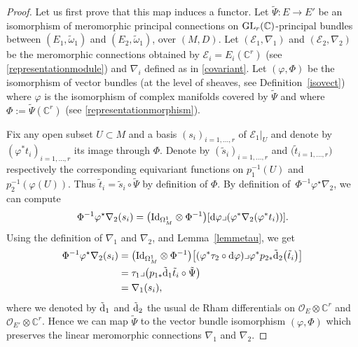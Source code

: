 \documentclass[pdftex]{sigma}
\numberwithin{equation}{section}
\begin{document}
\begin{proof} Let us first prove that this map induces a functor. Let $\tilde{\Psi}\colon E \longrightarrow E'$ be an isomorphism of meromorphic principal connections on ${\rm GL}_r(\mathbb{C})$-principal bundles between $(E_1,\tilde{\omega}_1)$ and $(E_2,\tilde{\omega}_1)$, over $(M,D)$. Let $(\mathcal{E}_1,\nabla_1)$ and $(\mathcal{E}_2,\nabla_2)$ be the meromorphic connections obtained by $\mathcal{E}_i=E_i(\mathbb{C}^r)$ (see \eqref{representationmodule}) and $\nabla_i$ defined as in \eqref{covariant}. Let $(\varphi,\Phi)$ be the isomorphism of vector bundles (at the level of sheaves, see Definition~\ref{isovect}) where $\varphi$ is the isomorphism of complex manifolds covered by $\tilde{\Psi}$ and where $\Phi:=\tilde{\Psi}(\mathbb{C}^r)$ (see \eqref{representationmorphism}).

Fix any open subset $U\subset M$ and a basis $(s_i)_{i=1,\dots,r}$ of $\mathcal{E}_1\vert_U$ and denote by $(\varphi^* t_i)_{i=1,\dots,r}$ its image through $\Phi$. Denote by $(\tilde{s}_i)_{i=1,\dots,r}$ and $\big(\tilde{t}_{i=1,\dots,r}\big)$ respectively the corresponding equivariant functions on $p_1^{-1}(U)$ and $p_2^{-1}(\varphi(U))$. Thus $\tilde{t}_i = \tilde{s}_i \circ \tilde{\Psi}$ by definition of $\Phi$. By definition of~$\Phi^{-1} \varphi^\star \nabla_2$, we can compute
\begin{gather*}
\Phi^{-1} \varphi^\star \nabla_2(s_i) = \big({\rm Id}_{\Omega^1_{M}} \otimes \Phi^{-1}\big)[{\rm d}\varphi \lrcorner (\varphi^* \nabla_2 (\varphi^* t_i))]. \end{gather*}
Using the definition of $\nabla_1$ and $\nabla_2$, and Lemma~\ref{lemmetau}, we get
\begin{align*}
 \Phi^{-1} \varphi^\star \nabla_2(s_i)&= \big({\rm Id}_{\Omega^1_{M}} \otimes \Phi^{-1}\big)\big[ (\varphi^*\tau_2\circ {\rm d}\varphi) \lrcorner \varphi^* p_{2*}\tilde{{\rm d}}_2\big(\tilde{t}_i\big)\big]\\
 &= \tau_1 \lrcorner \big(p_{1*}\tilde{{\rm d}}_1\tilde{t}_i \circ \tilde{\Psi}\big) \\
 &=\nabla_1(s_i), \end{align*}
 where we denoted by $\tilde{{\rm d}}_1$ and $\tilde{{\rm d}}_2$ the usual de Rham differentials on $\mathcal{O}_{E}\otimes \mathbb{C}^r$ and $\mathcal{O}_{E'}\otimes \mathbb{C}^r$. Hence we can map $\tilde{\Psi}$ to the vector bundle isomorphism $(\varphi,\Phi)$ which preserves the linear meromorphic connections $\nabla_1$ and $\nabla_2$.



\end{proof}
\end{document}
